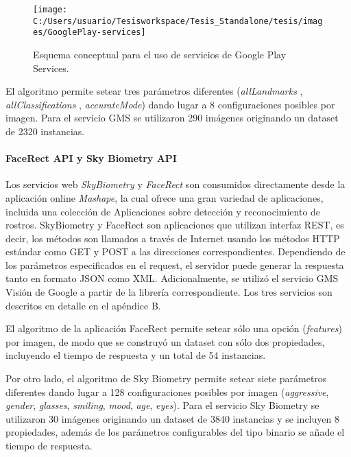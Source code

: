 \begin{figure}[H]
\begin{centering}
\texttt{[image: C:/Users/usuario/Tesisworkspace/Tesis\_Standalone/tesis/images/GooglePlay-services]}
\par\end{centering}

\caption{Esquema conceptual para el uso de servicios de Google Play Services.\label{fig:GooglePlay-services}}


%
%
\end{figure}


El algoritmo permite setear tres parámetros diferentes (\emph{allLandmarks}
, \emph{allClassifications} , \emph{accurateMode}) dando lugar a 8
configuraciones posibles por imagen. Para el servicio GMS se utilizaron
290 imágenes originando un dataset de 2320 instancias. 


\paragraph{FaceRect API y Sky Biometry API}

Los servicios web \emph{SkyBiometry} y \emph{FaceRect} son consumidos
directamente desde la aplicación online \emph{Mashape}, la cual ofrece
una gran variedad de aplicaciones, incluida una colección de Aplicaciones
sobre detección y reconocimiento de rostros. SkyBiometry y FaceRect
son aplicaciones que utilizan interfaz REST, es decir, los métodos
son llamados a través de Internet usando los métodos \ac{HTTP} estándar
como GET y POST a las direcciones correspondientes. Dependiendo de
los parámetros especificados en el request, el servidor puede generar
la respuesta tanto en formato \ac{JSON} como \ac{XML}. Adicionalmente,
se utilizó el servicio GMS Visión de Google a partir de la librería
correspondiente. Los tres servicios son descritos en detalle en el
apéndice B.

El algoritmo de la aplicación FaceRect permite setear sólo una opción
(\emph{features}) por imagen, de modo que se construyó un dataset
con sólo dos propiedades, incluyendo el tiempo de respuesta y un total
de 54 instancias. 

Por otro lado, el algoritmo de Sky Biometry permite setear siete parámetros
diferentes dando lugar a 128 configuraciones posibles por imagen (\emph{aggressive},
\emph{gender}, \emph{glasses}, \emph{smiling}, \emph{mood}, \emph{age},\emph{
eyes}). Para el servicio Sky Biometry se utilizaron 30 imágenes originando
un dataset de 3840 instancias y se incluyen 8 propiedades, además
de los parámetros configurables del tipo binario se añade el tiempo
de respuesta. 


